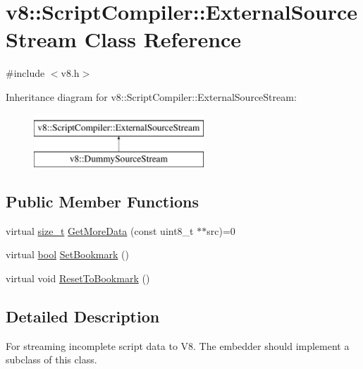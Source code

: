 \hypertarget{classv8_1_1ScriptCompiler_1_1ExternalSourceStream}{}\section{v8\+:\+:Script\+Compiler\+:\+:External\+Source\+Stream Class Reference}
\label{classv8_1_1ScriptCompiler_1_1ExternalSourceStream}


{\ttfamily \#include $<$v8.\+h$>$}

Inheritance diagram for v8\+:\+:Script\+Compiler\+:\+:External\+Source\+Stream\+:\begin{figure}[H]
\begin{center}
\leavevmode
\includegraphics[height=2.000000cm]{classv8_1_1ScriptCompiler_1_1ExternalSourceStream}
\end{center}
\end{figure}
\subsection*{Public Member Functions}
\begin{DoxyCompactItemize}
\item 
virtual \mbox{\hyperlink{classsize__t}{size\+\_\+t}} \mbox{\hyperlink{classv8_1_1ScriptCompiler_1_1ExternalSourceStream_ac3a0221b5725f0b612a6342d8e83d899}{Get\+More\+Data}} (const uint8\+\_\+t $\ast$$\ast$src)=0
\item 
virtual \mbox{\hyperlink{classbool}{bool}} \mbox{\hyperlink{classv8_1_1ScriptCompiler_1_1ExternalSourceStream_a0012cebde92a3a61ec033e3abc2dd2ee}{Set\+Bookmark}} ()
\item 
virtual void \mbox{\hyperlink{classv8_1_1ScriptCompiler_1_1ExternalSourceStream_af950fd00676e6bdb8642791f651b161a}{Reset\+To\+Bookmark}} ()
\end{DoxyCompactItemize}


\subsection{Detailed Description}
For streaming incomplete script data to V8. The embedder should implement a subclass of this class. 

